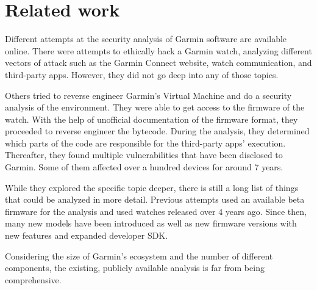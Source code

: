 \section{Related work}

Different attempts at the security analysis of Garmin software are available online.
There were attempts to ethically hack a Garmin watch\cite{kth-ethical-hacking,kth-audit}, analyzing different vectors of attack such as the Garmin Connect website, watch communication, and third-party apps.
However, they did not go deep into any of those topics.

Others tried to reverse engineer Garmin’s Virtual Machine and do a security analysis of the environment\cite{broken-vm,compromising-garmin-watches}.
They were able to get access to the firmware of the watch.
With the help of unofficial documentation of the firmware format\cite{firmware-format}, they proceeded to reverse engineer the bytecode.
During the analysis, they determined which parts of the code are responsible for the third-party apps' execution.
Thereafter, they found multiple vulnerabilities that have been disclosed to Garmin.
Some of them affected over a hundred devices for around 7 years.

While they explored the specific topic deeper, there is still a long list of things that could be analyzed in more detail.
Previous attempts used an available beta firmware for the analysis and used watches released over 4 years ago.
Since then, many new models have been introduced as well as new firmware versions with new features and expanded developer SDK.

Considering the size of Garmin's ecosystem and the number of different components, the existing, publicly available analysis is far from being comprehensive.


